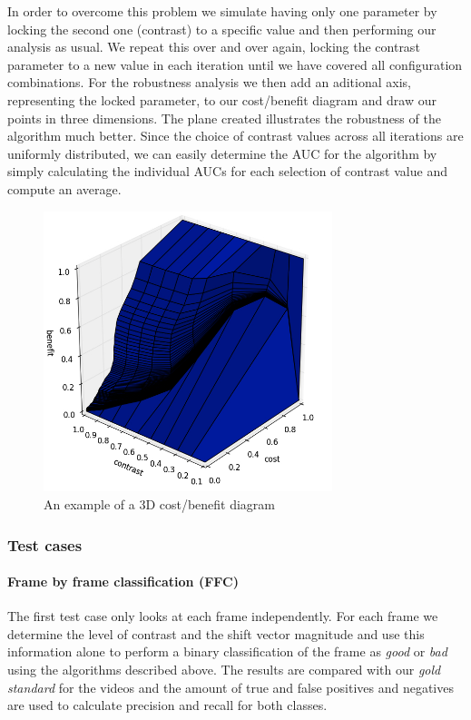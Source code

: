 %
%
%
%
In order to overcome this problem we simulate having only one parameter by locking the second one (contrast) to a specific value and then performing our analysis as usual. We repeat this over and over again, locking the contrast parameter to a new value in each iteration until we have covered all configuration combinations. For the robustness analysis we then add an aditional axis, representing the locked parameter, to our cost/benefit diagram and draw our points in three dimensions. The plane created illustrates the robustness of the algorithm much better. Since the choice of contrast values across all iterations are uniformly distributed, we can easily determine the AUC for the algorithm by simply calculating the individual AUCs for each selection of contrast value and compute an average.
%
\begin{figure}
     \centering
     \includegraphics[width=0.75\textwidth]{img/3dcostbenefitexample.jpg}
     \caption{An example of a 3D cost/benefit diagram}
\end{figure}
%
\subsubsection{Test cases} \label{sec:testcases}
%
\paragraph{Frame by frame classification (FFC)}
%
The first test case only looks at each frame independently. For each frame we determine the level of contrast and the shift vector magnitude and use this information alone to perform a binary classification of the frame as \textit{good} or \textit{bad} using the algorithms described above. The results are compared with our \textit{gold standard} for the videos and the amount of true and false positives and negatives are used to calculate precision and recall for both classes.
%
